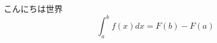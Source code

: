 \documentclass[a4paper]{article}
\begin{document}
	こんにちは世界
\begin{equation}
    \int_{a}^{b} f(x) dx = F(b) - F(a)
\end{equation}
\end{document}
